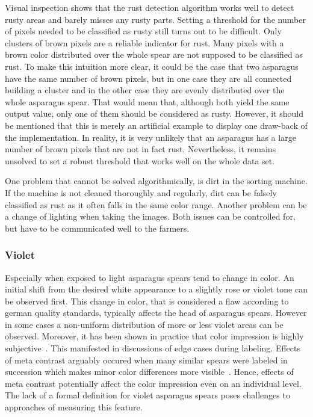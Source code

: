 Visual inspection shows that the rust detection algorithm works well to detect rusty areas and barely misses any rusty parts. Setting a threshold for the number of pixels needed to be classified as rusty still turns out to be difficult. Only clusters of brown pixels are a reliable indicator for rust.  Many pixels with a brown color distributed over the whole spear are not supposed to be classified as rust. To make this intuition more clear, it could be the case that two asparagus have the same number of brown pixels, but in one case they are all connected building a cluster and in the other case they are evenly distributed over the whole asparagus spear. That would mean that, although both yield the same output value, only one of them should be considered as rusty. However, it should be mentioned that this is merely an artificial example to display one draw-back of the implementation. In reality, it is very unlikely that an asparagus has a large number of brown pixels that are not in fact rust. Nevertheless, it remains unsolved to set a robust threshold that works well on the whole data set.

\bigskip
One problem that cannot be solved algorithmically, is dirt in the sorting machine. If the machine is not cleaned thoroughly and regularly, dirt can be falsely classified as rust as it often falls in the same color range. Another problem can be a change of lighting when taking the images. Both issues can be controlled for, but have to be communicated well to the farmers.

\subsubsection{Violet}
\label{subsec:Violet}

Especially when exposed to light asparagus spears tend to change in color. An initial shift from the desired white appearance to a slightly rose or violet tone can be observed first. This change in color, that is considered a flaw according to german quality standards, typically affects the head of asparagus spears. However in some cases a non-uniform distribution of more or less violet areas can be observed. Moreover, it has been shown in practice that color impression is highly subjective~\citep{luo2000review}. This manifested in discussions of edge cases during labeling. Effects of meta contrast arguably occured when many similar spears were labeled in succession which makes minor color differences more visible~\citep{reeves1981metacontrast}. Hence, effects of meta contrast potentially affect the color impression even on an individual level. The lack of a formal definition for violet asparagus spears poses challenges to approaches of measuring this feature.

